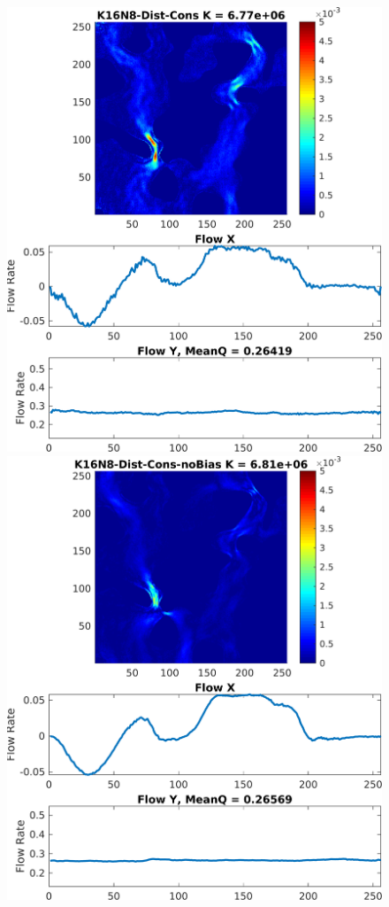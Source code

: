 \documentclass{article}
\begin{document}
\begin{figure}[htp!]
\begin{minipage}[b]{0.32\textwidth}
    \includegraphics[width=\textwidth]{figures/velCNNs1117-5.png}
  \end{minipage}
  \vspace{5mm}
    \begin{minipage}[b]{0.32\textwidth}
    \includegraphics[width=\textwidth]{figures/velCNNs1117-6.png}

\end{minipage}
\end{figure}
\end{document}
